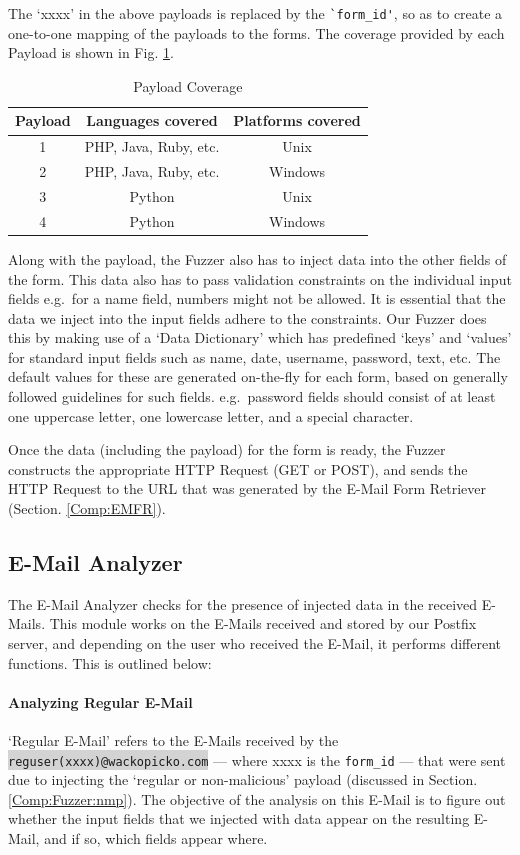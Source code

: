 The `xxxx' in the above payloads is replaced by the \lstinline{`form_id'}, so as to create a one-to-one mapping of the payloads to the forms. The coverage provided by each Payload is shown in Fig. \ref{tab:payloadcov}.\\

\begin{table}[!htbp]
	\centering
	\begin{tabular}{|c|c|c|}
		\hline
		Payload & Languages covered & Platforms covered\\
		\hline
		1 & PHP, Java, Ruby, etc. & Unix\\
		\hline
		2 & PHP, Java, Ruby, etc. & Windows\\
		\hline
		3 & Python & Unix\\
		\hline
		4 & Python & Windows\\
		\hline
	\end{tabular}
	\caption{Payload Coverage}
	\label{tab:payloadcov}
\end{table}
Along with the payload, the Fuzzer also has to inject data into the other fields of the form. This data also has to pass validation constraints on the individual input fields e.g.\ for a name field, numbers might not be allowed. It is essential that the data we inject into the input fields adhere to the constraints. Our Fuzzer does this by making use of a `Data Dictionary' which has predefined `keys' and `values' for standard input fields such as name, date, username, password, text, etc. The default values for these are generated on-the-fly for each form, based on generally followed guidelines for such fields. e.g.\ password fields should consist of at least one uppercase letter, one lowercase letter, and a special character.

Once the data (including the payload) for the form is ready, the Fuzzer constructs the appropriate HTTP Request (GET or POST), and sends the HTTP Request to the URL that was generated by the E-Mail Form Retriever (Section. \ref{Comp:EMFR}). 


\subsection{E-Mail Analyzer}
\label{Comp:EMA}
The E-Mail Analyzer checks for the presence of injected data in the received E-Mails. This module works on the E-Mails received and stored by our Postfix server, and depending on the user who received the E-Mail, it performs different functions. This is outlined below:
\paragraph{Analyzing Regular E-Mail}
`Regular E-Mail' refers to the E-Mails received by the \colorbox{lightgray}{\lstinline{reguser(xxxx)@wackopicko.com}} --- where xxxx is the \lstinline{form_id} --- that were sent due to injecting the `regular or non-malicious' payload (discussed in Section. \ref{Comp:Fuzzer:nmp}). The objective of the analysis on this E-Mail is to figure out whether the input fields that we injected with data appear on the resulting E-Mail, and if so, which fields appear where.

